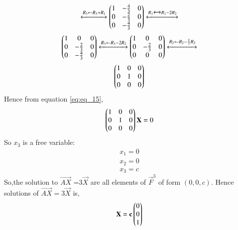 \documentclass[journal,12pt,twocolumn]{IEEEtran}
\begin{document}
\begin{flushleft}
\begin{align}
    \xleftrightarrow[]{R_3 \leftarrow R_3+R_1 }
    \begin{pmatrix}1&-\frac{4}{3}&0\\
            0&-\frac{2}{3}&0\\
            0&-\frac{4}{3}&0\end{pmatrix}
    \xleftrightarrow[]{R_1 \xleftrightarrow[]{} R_1 -2R_2 } \nonumber
\end{align}
\begin{align}
    \begin{pmatrix}1&0&0\\
    0&-\frac{2}{3}&0\\
    0&-\frac{4}{3}&0\end{pmatrix}
    \xleftrightarrow[]{R_3 \leftarrow R_3-2R_2} 
    \begin{pmatrix}1&0&0\\
           0&-\frac{2}{3}&0\\
         0&0&0\end{pmatrix}   
    \xleftrightarrow[]{R_2 \leftarrow R_2-\frac{2}{3}R_2} \nonumber
\end{align}
\begin{align} \label{eq:eq_15}
    \begin{pmatrix}1&0&0\\
    0&1&0\\
    0&0&0\end{pmatrix} 
\end{align}
Hence from equation \eqref{eq:eq_15},
 \begin{align}
\begin{pmatrix}
1&0&0\\
0&1&0\\
0&0&0
 \end{pmatrix}\mathbf{X}=0
\end{align}
So $x_3$ is a free variable:
\begin{align}
  x_1=0\\
  x_2=0\\
  x_3=c
\end{align}
 So,the solution to $\vec {AX}$ =3$\vec{X}$ are all elements of $\vec{F}^3$ of form $(0,0,c)$. 
 Hence solutions of
 $\vec{AX}=3\vec{X}$ is,
 \begin{align}
 \mathbf{X} =
 \mathbf{c}
 \begin{pmatrix}
 0\\0\\1
 \end{pmatrix}
 \end{align}
\end{flushleft}
\end{document}
